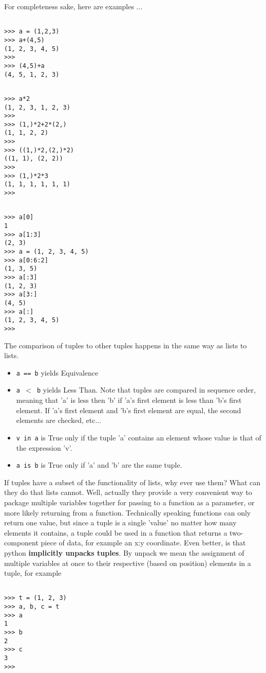 For completeness sake, here are examples ...
\begin{lstlisting}

>>> a = (1,2,3)
>>> a+(4,5)
(1, 2, 3, 4, 5)
>>>
>>> (4,5)+a
(4, 5, 1, 2, 3)
\end{lstlisting}
\begin{lstlisting}

>>> a*2
(1, 2, 3, 1, 2, 3)
>>>
>>> (1,)*2+2*(2,)
(1, 1, 2, 2)
>>>
>>> ((1,)*2,(2,)*2)
((1, 1), (2, 2))
>>>
>>> (1,)*2*3
(1, 1, 1, 1, 1, 1)
>>>
\end{lstlisting}
\begin{lstlisting}

>>> a[0]
1
>>> a[1:3]
(2, 3)
>>> a = (1, 2, 3, 4, 5)
>>> a[0:6:2]
(1, 3, 5)
>>> a[:3]
(1, 2, 3)
>>> a[3:]
(4, 5)
>>> a[:]
(1, 2, 3, 4, 5)
>>>
\end{lstlisting}

The comparison of tuples to other tuples happens in the same way as   lists to lists.
\begin{itemize}
	\item 
\texttt{a == b} yields Equivalence
	\item 
\texttt{a $<$ b} yields Less Than. Note that tuples are    compared in sequence order, meaning that 'a' is less then 'b' if    'a's first element is less than 'b's first element. If 'a's first    element and 'b's first element are equal, the second elements are    checked, etc...
	\item 
\texttt{v in a} is True only if the tuple 'a' contains an    element whose value is that of the expression 'v'.
	\item 
\texttt{a is b} is True only if 'a' and 'b' are the same    tuple.
\end{itemize}

If tuples have a subset of the functionality of lists, why ever use   them? What can they do that lists cannot. Well, actually they provide a   very convenient way to package multiple variables together for passing   to a function as a parameter, or more likely returning from a function.   Technically speaking functions can only return one value, but since a   tuple is a single 'value' no matter how many elements it contains, a   tuple could be used in a function that returns a two-component piece of   data, for example an x:y coordinate. Even better, is that python   \textbf{implicitly unpacks tuples}. By unpack we mean the   assignment of multiple variables at once to their respective (based on   position) elements in a tuple, for example
\begin{lstlisting}

>>> t = (1, 2, 3)
>>> a, b, c = t
>>> a
1
>>> b
2
>>> c
3
>>>
\end{lstlisting}

